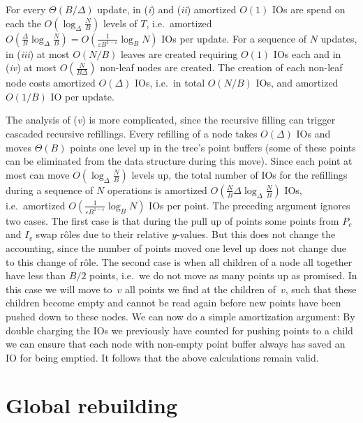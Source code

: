 \documentclass[11pt]{article}
\begin{document}
For every $\Theta(B/\Delta)$ update, in (\textit{i}) and (\textit{ii})
amortized $O(1)$ IOs are spend on each the $O(\log_\Delta
\frac{N}{B})$ levels of $T$, i.e.\ amortized $O(\frac{\Delta}{B}
\log_\Delta \frac{N}{B})=O(\frac{1}{\varepsilon
  B^{1-\varepsilon}}\log_B N)$ IOs per update. For a sequence of $N$
updates, in (\textit{iii}) at most $O(N/B)$ leaves are created
requiring $O(1)$ IOs each and in (\textit{iv}) at most
$O(\frac{N}{B\Delta})$ non-leaf nodes are created. The creation of
each non-leaf node costs amortized $O(\Delta)$ IOs, i.e.\ in total
$O(N/B)$ IOs, and amortized $O(1/B)$ IO per update.

The analysis of (\textit{v}) is more complicated, since the recursive
filling can trigger cascaded recursive refillings. Every refilling of
a node takes $O(\Delta)$ IOs and moves $\Theta(B)$ points one level up
in the tree's point buffers (some of these points can be eliminated
from the data structure during this move). Since each point at most
can move $O(\log_\Delta \frac{N}{B})$ levels up, the total number of
IOs for the refillings during a sequence of $N$ operations is
amortized $O(\frac{N}{B}\Delta \log_\Delta \frac{N}{B})$ IOs,
i.e.\ amortized $O(\frac{1}{\varepsilon B^{1-\varepsilon}}\log_B N)$
IOs per point.
%
The preceding argument ignores two cases. The first case is that
during the pull up of points some points from $P_c$ and $I_v$ swap
r\^oles due to their relative $y$-values. But this does not change the
accounting, since the number of points moved one level up does not
change due to this change of r\^ ole.  The second case is when all
children of a node all together have less than $B/2$ points, i.e.\ we
do not move as many points up as promised. In this case we will move
to~$v$ all points we find at the children of~$v$, such that these
children become empty and cannot be read again before new points have
been pushed down to these nodes. We can now do a simple amortization
argument: By double charging the IOs we previously have counted for
pushing points to a child we can ensure that each node with non-empty
point buffer always has saved an IO for being emptied. It follows that
the above calculations remain valid.

\section{Global rebuilding}
\label{sec:global-rebuilding}
\end{document}
